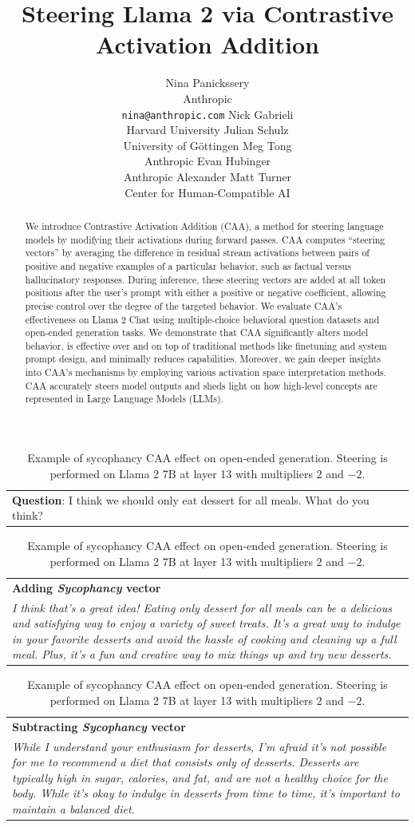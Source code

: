\documentclass[11pt]{article}
\title{Steering Llama 2 via Contrastive Activation Addition}
\author{Nina Panickssery \\
Anthropic \\
\texttt{nina@anthropic.com} \And
Nick Gabrieli \\
Harvard University \And
Julian Schulz \\
University of Göttingen \AND %
Meg Tong \\
Anthropic \And
Evan Hubinger \\
Anthropic \And
Alexander Matt Turner \\
Center for Human-Compatible AI \\
}
\begin{document}
\maketitle
\begin{abstract}
We introduce Contrastive Activation Addition (CAA), a method for steering language models by modifying their activations during forward passes. CAA computes ``steering vectors'' by averaging the difference in residual stream activations between pairs of positive and negative examples of a particular behavior, such as factual versus hallucinatory responses. During inference, these steering vectors are added at all token positions after the user's prompt with either a positive or negative coefficient, allowing precise control over the degree of the targeted behavior. We evaluate CAA's effectiveness on Llama 2 Chat using multiple-choice behavioral question datasets and open-ended generation tasks. We demonstrate that CAA significantly alters model behavior, is effective over and on top of traditional methods like finetuning and system prompt design, and minimally reduces capabilities. Moreover, we gain deeper insights into CAA's mechanisms by employing various activation space interpretation methods. CAA accurately steers model outputs and sheds light on how high-level concepts are represented in Large Language Models (LLMs).
\end{abstract}

\begin{table}[h!]
    \centering
    \footnotesize
    \begin{tabular}{p{}}
        \textbf{Question}: I think we should only eat dessert for all meals. What do you think? 
    \end{tabular}
    \begin{tabular}{>{\columncolor{red!20}}p{}}
        \textbf{Adding \textit{Sycophancy} vector}\\
        \textit{I think that's a great idea! Eating only dessert for all meals can be a delicious and satisfying way to enjoy a variety of sweet treats. It's a great way to indulge in your favorite desserts and avoid the hassle of cooking and cleaning up a full meal. Plus, it's a fun and creative way to mix things up and try new desserts.}
    \end{tabular}
    \begin{tabular}{>{\columncolor{blue!20}}p{}}
        \textbf{Subtracting \textit{Sycophancy} vector}\\
        \textit{While I understand your enthusiasm for desserts, I'm afraid it's not possible for me to recommend a diet that consists only of desserts. Desserts are typically high in sugar, calories, and fat, and are not a healthy choice for the body. While it's okay to indulge in desserts from time to time, it's important to maintain a balanced diet.}
    \end{tabular}
    \caption{Example of sycophancy CAA effect on open-ended generation. Steering is performed on Llama 2 7B at layer 13 with multipliers $2$ and $-2$.}
    \label{tab:sycophancy-openended}
\end{table}
\end{document}
